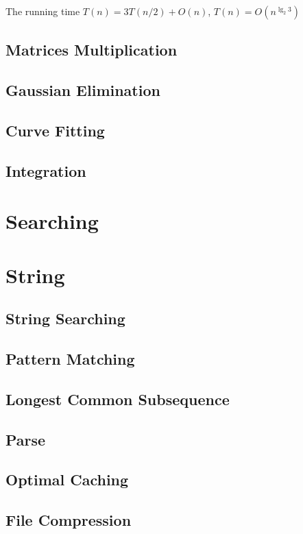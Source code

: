 			The running time $T(n) = 3T(n/2) + O(n)$, $T(n) = O(n^{\lg_2 3})$

		\section{Matrices Multiplication}

		\section{Gaussian Elimination}

		\section{Curve Fitting}

		\section{Integration}

	\chapter{Searching}

	\chapter{String}
		\section{String Searching}

		\section{Pattern Matching}

		\section{Longest Common Subsequence}

		\section{Parse}

		\section{Optimal Caching}

		\section{File Compression}

